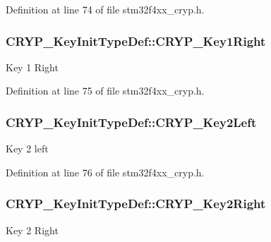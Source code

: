 Definition at line 74 of file stm32f4xx\-\_\-cryp.\-h.

\hypertarget{struct_c_r_y_p___key_init_type_def_a08bf87c29a0df961b92f31cf327fdc55}{
\subsubsection[{C\-R\-Y\-P\-\_\-\-Key1\-Right}]{ C\-R\-Y\-P\-\_\-\-Key\-Init\-Type\-Def\-::\-C\-R\-Y\-P\-\_\-\-Key1\-Right}}\label{struct_c_r_y_p___key_init_type_def_a08bf87c29a0df961b92f31cf327fdc55}
Key 1 Right 

Definition at line 75 of file stm32f4xx\-\_\-cryp.\-h.

\hypertarget{struct_c_r_y_p___key_init_type_def_acd33140c0954fda504be5ba5851b217a}{
\subsubsection[{C\-R\-Y\-P\-\_\-\-Key2\-Left}]{ C\-R\-Y\-P\-\_\-\-Key\-Init\-Type\-Def\-::\-C\-R\-Y\-P\-\_\-\-Key2\-Left}}\label{struct_c_r_y_p___key_init_type_def_acd33140c0954fda504be5ba5851b217a}
Key 2 left 

Definition at line 76 of file stm32f4xx\-\_\-cryp.\-h.

\hypertarget{struct_c_r_y_p___key_init_type_def_a94dd0a58f91f3b0efc09fe84f6af922d}{
\subsubsection[{C\-R\-Y\-P\-\_\-\-Key2\-Right}]{ C\-R\-Y\-P\-\_\-\-Key\-Init\-Type\-Def\-::\-C\-R\-Y\-P\-\_\-\-Key2\-Right}}\label{struct_c_r_y_p___key_init_type_def_a94dd0a58f91f3b0efc09fe84f6af922d}
Key 2 Right 


